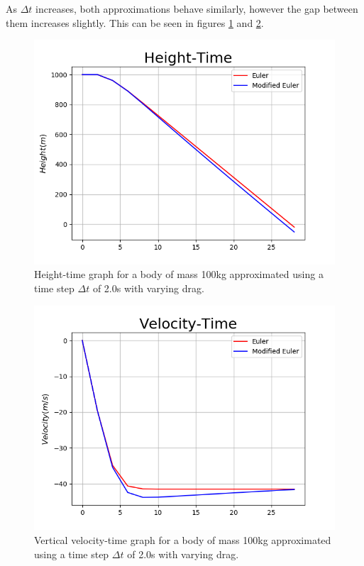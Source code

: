 \documentclass[twocolumn,prl,nobalancelastpage,aps,10pt]{revtex4-1}
\begin{document}
As $\Delta t$ increases, both approximations behave similarly, however the gap between them increases slightly. This can be seen in figures \ref{euler-fig-ht-t=2.0} and \ref{euler-fig-vt-t=2.0}.
\begin{figure}
	\includegraphics*[width=0.96\linewidth,clip]{euler-fig-ht-t=20}
	\caption{Height-time graph for a body of mass 100kg approximated using a time step $\Delta t$ of  2.0s with varying drag.}\label{euler-fig-ht-t=2.0}
\end{figure}
\begin{figure}
	\includegraphics*[width=0.96\linewidth,clip]{euler-fig-vt-t=20}
	\caption{Vertical velocity-time graph for a body of mass 100kg approximated using a time step $\Delta t$ of  2.0s with varying drag.}\label{euler-fig-vt-t=2.0}
\end{figure}
\end{document}
